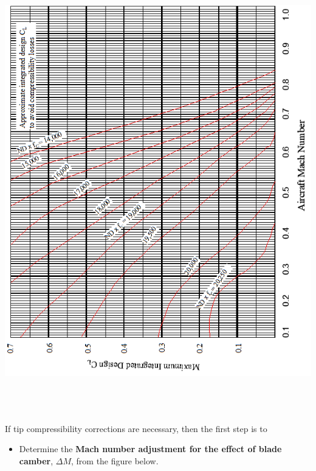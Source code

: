 \documentclass[
]{book}
\providecommand{\tightlist}{%
  \setlength{\itemsep}{0pt}\setlength{\parskip}{0pt}}
\begin{document}
\includegraphics[width=6.24931in,height=7.56181in]{media/11/image27.png}

If tip compressibility corrections are necessary, then the first step is to

\begin{itemize}
\tightlist
\item
  Determine the \textbf{Mach number adjustment for the effect of blade camber}, \(\Delta M\), from the figure below.
\end{itemize}
\end{document}
